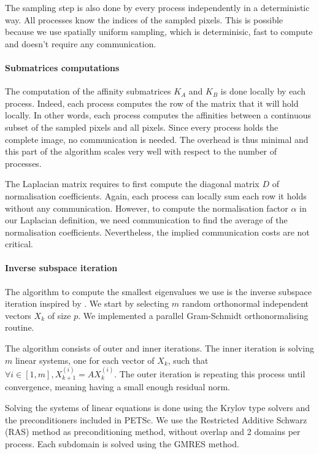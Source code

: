 The sampling step is also done by every process independently in a deterministic way.
All processes know the indices of the sampled pixels.
This is possible because we use spatially uniform sampling, which is determinisic, fast to compute and doesn't require any communication.

\paragraph{Submatrices computations}
The computation of the affinity submatrices \(K_A\) and \(K_B\) is done locally by each process.
Indeed, each process computes the row of the matrix that it will hold locally.
In other words, each process computes the affinities between a continuous subset of the sampled pixels and all pixels.
Since every process holds the complete image, no communication is needed.
The overhead is thus minimal and this part of the algorithm scales very well with respect to the number of processes.

The Laplacian matrix requires to first compute the diagonal matrix \(D\) of normalisation coefficients.
Again, each process can locally sum each row it holds without any communication.
However, to compute the normalisation factor \(\alpha\) in our Laplacian definition, we need communication to find the average of the normalisation coefficients.
Nevertheless, the implied communication costs are not critical.

\paragraph{Inverse subspace iteration}
The algorithm to compute the smallest eigenvalues we use is the inverse subspace iteration inspired by \cite{el_khoury_acceleration_2014}.
We start by selecting \(m\) random orthonormal independent vectors \(X_k\) of size \(p\).
We implemented a parallel Gram-Schmidt orthonormalising routine.

The algorithm consists of outer and inner iterations.
The inner iteration is solving \(m\) linear systems, one for each vector of \(X_k\), such that \(\forall i \in [1, m], X_{k+1}^{(i)} = A X_k^{(i)}\).
The outer iteration is repeating this process until convergence, meaning having a small enough residual norm.

Solving the systems of linear equations is done using the Krylov type solvers and the preconditioners included in PETSc.
We use the Restricted Additive Schwarz (RAS) method as preconditioning method, without overlap and 2 domains per process.
Each subdomain is solved using the GMRES method.

